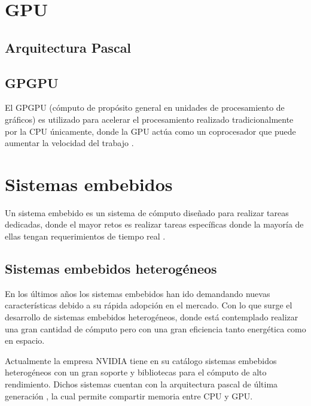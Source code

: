 \section{GPU}

\subsection{Arquitectura Pascal}

\subsection{GPGPU}
El GPGPU (cómputo de propósito general en unidades de procesamiento de gráficos) es utilizado para acelerar el procesamiento realizado tradicionalmente por la CPU únicamente, donde la GPU actúa como un coprocesador que puede aumentar la velocidad del trabajo \cite{GPU}.

\section{Sistemas embebidos}

Un sistema embebido es un sistema de cómputo diseñado para realizar tareas dedicadas, donde el mayor retos es realizar tareas específicas donde la mayoría de ellas tengan requerimientos de tiempo real \cite{LimPree}.

\subsection{Sistemas embebidos heterogéneos}
%
\vspace{0.3cm}
En los últimos años los sistemas embebidos han ido demandando nuevas características debido a su rápida adopción en el mercado. Con lo que surge el desarrollo de sistemas embebidos heterogéneos, donde está contemplado realizar una gran cantidad de cómputo pero con una gran eficiencia tanto energética como en espacio.
\vspace{0.3cm}

Actualmente la empresa NVIDIA tiene en su catálogo sistemas embebidos heterogéneos con un gran soporte y bibliotecas para el cómputo de alto rendimiento. Dichos sistemas cuentan con la arquitectura pascal de última generación \cite{GPUArt}, la cual permite compartir memoria entre CPU y GPU.

